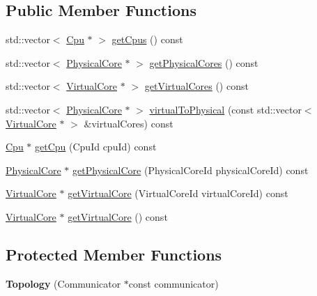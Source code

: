 \subsection*{Public Member Functions}
\begin{DoxyCompactItemize}
\item 
std\-::vector$<$ \hyperlink{classmammut_1_1topology_1_1Cpu}{Cpu} $\ast$ $>$ \hyperlink{classmammut_1_1topology_1_1Topology_aeb4616d9aa50bfd992f5a335688552c9}{get\-Cpus} () const 
\item 
std\-::vector$<$ \hyperlink{classmammut_1_1topology_1_1PhysicalCore}{Physical\-Core} $\ast$ $>$ \hyperlink{classmammut_1_1topology_1_1Topology_a6644abd6f67a074997336af59cf42df4}{get\-Physical\-Cores} () const 
\item 
std\-::vector$<$ \hyperlink{classmammut_1_1topology_1_1VirtualCore}{Virtual\-Core} $\ast$ $>$ \hyperlink{classmammut_1_1topology_1_1Topology_afb23140b03b50b99cd08dc7a711a0c9e}{get\-Virtual\-Cores} () const 
\item 
std\-::vector$<$ \hyperlink{classmammut_1_1topology_1_1PhysicalCore}{Physical\-Core} $\ast$ $>$ \hyperlink{classmammut_1_1topology_1_1Topology_a65ec01bacc68046bf4b4f8e5077a8664}{virtual\-To\-Physical} (const std\-::vector$<$ \hyperlink{classmammut_1_1topology_1_1VirtualCore}{Virtual\-Core} $\ast$ $>$ \&virtual\-Cores) const 
\item 
\hyperlink{classmammut_1_1topology_1_1Cpu}{Cpu} $\ast$ \hyperlink{classmammut_1_1topology_1_1Topology_a1966810401123e9102866618b2f21339}{get\-Cpu} (Cpu\-Id cpu\-Id) const 
\item 
\hyperlink{classmammut_1_1topology_1_1PhysicalCore}{Physical\-Core} $\ast$ \hyperlink{classmammut_1_1topology_1_1Topology_a36b26297620a685fddf49c18f91be3ad}{get\-Physical\-Core} (Physical\-Core\-Id physical\-Core\-Id) const 
\item 
\hyperlink{classmammut_1_1topology_1_1VirtualCore}{Virtual\-Core} $\ast$ \hyperlink{classmammut_1_1topology_1_1Topology_a5377aee40c36010aa36d53a75bf18292}{get\-Virtual\-Core} (Virtual\-Core\-Id virtual\-Core\-Id) const 
\item 
\hyperlink{classmammut_1_1topology_1_1VirtualCore}{Virtual\-Core} $\ast$ \hyperlink{classmammut_1_1topology_1_1Topology_a95ff1c09b91b15fa7df6d6611e4fb9ea}{get\-Virtual\-Core} () const 
\end{DoxyCompactItemize}
\subsection*{Protected Member Functions}
\begin{DoxyCompactItemize}
\item 
\hypertarget{classmammut_1_1topology_1_1Topology_aadbbf4d1100af0b20ab44567c718b985}{{\bfseries Topology} (Communicator $\ast$const communicator)}\label{classmammut_1_1topology_1_1Topology_aadbbf4d1100af0b20ab44567c718b985}

\end{DoxyCompactItemize}

